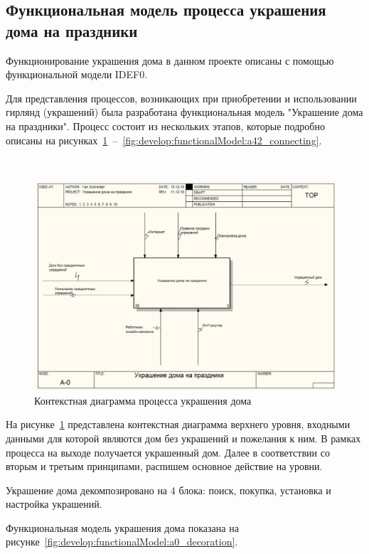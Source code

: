\subsection{Функциональная модель процесса украшения дома на праздники}
\label{sec:develop:functionalModel}

Функционирование украшения дома в данном проекте описаны с помощью функциональной модели IDEF0.

Для представления процессов, возникающих при приобретении и использовании гирлянд (украшений) была разработана функциональная модель "Украшение дома на праздники". Процесс состоит из нескольких этапов, которые подробно описаны на рисунках~\ref{fig:develop:functionalModel:main}~–~\ref{fig:develop:functionalModel:a42_connecting}.

~
\begin{figure}[H]
\centering
	\includegraphics[scale=0.6]{figures/functionalModel/main.jpg}
	\caption{Контекстная диаграмма процесса украшения дома}
	\label{fig:develop:functionalModel:main}
\end{figure}

На рисунке~\ref{fig:develop:functionalModel:main} представлена контекстная диаграмма верхнего уровня, входными данными для которой являются дом без украшений и пожелания к ним. В рамках процесса на выходе получается украшенный дом. Далее в соответствии со вторым и третьим принципами, распишем основное действие на уровни.

Украшение дома декомпозировано на 4 блока: поиск, покупка, установка и настройка украшений.

Функциональная модель украшения дома показана на рисунке~\ref{fig:develop:functionalModel:a0_decoration}.

